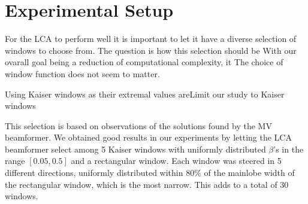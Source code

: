 \documentclass[10pt,journal,draftclsnofoot,onecolumn]{IEEEtran}
\newcommand\1{\vec 1}
\begin{document}
% 

\section{Experimental Setup}

For the LCA to perform well it is important to let it have a diverse selection of windows to choose from. The question is how this selection should be With our ovarall goal being a reduction of computational complexity, it The choice of window function does not seem to matter. 



Using Kaiser windows as their extremal values areLimit our study to Kaiser windows



This selection is based on observations of the solutions found by the MV beamformer. We obtained good results in our experiments by letting the LCA beamformer select among 5 Kaiser windows with uniformly distributed $\beta$'s in the range $[0.05, 0.5]$ and a rectangular window. Each window was steered in 5 different directions, uniformly distributed within 80\% of the mainlobe width of the rectangular window, which is the most narrow. This adds to a total of 30 windows.
\end{document}
